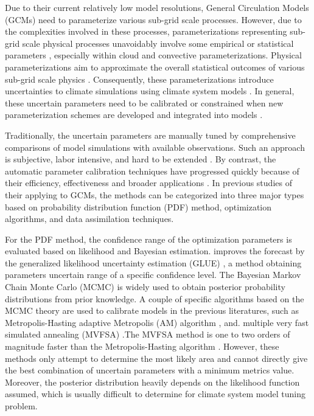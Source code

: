 \documentclass[gmd, manuscript]{copernicus}
\begin{document}
\introduction  %

Due to their current relatively low model resolutions, General Circulation Models (GCMs) need to parameterize various sub-grid scale processes. However, due to the complexities involved in these processes, parameterizations representing sub-grid scale physical processes unavoidably involve some empirical or statistical parameters \citep{hack1994climate}, especially within cloud and convective parameterizations. Physical parameterizations aim to approximate the overall statistical outcomes of various sub-grid scale physics \citep{williams2005modelling}. Consequently, these parameterizations introduce uncertainties to climate simulations using climate system models \citep{warren1979seasonal}. In general, these uncertain parameters need to be calibrated or constrained when new parameterization schemes are developed and integrated into models \citep{li2013evaluation}.


Traditionally, the uncertain parameters are manually tuned by comprehensive comparisons of model simulations with available observations. Such an approach is subjective, labor intensive, and hard to be extended \citep{hakkarainen2012closure, allen2000quantifying}. By contrast, the automatic parameter calibration techniques have progressed quickly because of their efficiency, effectiveness and broader applications \citep{emi2013collaborative,elkinton2008algorithms,jakumeit2005parameter,chen1999optimum}. In previous studies of their applying to GCMs, the methods can be categorized into three major types based on probability distribution function (PDF) method, optimization algorithms, and data assimilation techniques. 


For the PDF method, the confidence range of the optimization parameters is evaluated based on likelihood and Bayesian estimation. \cite{cameron1999flood} improves the forecast by the generalized likelihood uncertainty estimation (GLUE) \citep{beven1992future}, a method obtaining parameters uncertain range of a specific confidence level. The Bayesian Markov Chain Monte Carlo (MCMC) \citep{gilks2005markov} is widely used to obtain posterior probability distributions from prior knowledge. A couple of specific algorithms based on the MCMC theory are used to calibrate models in the previous literatures, such as Metropolis-Hasting \cite{sun2013inverse} adaptive Metropolis (AM) algorithm \cite{hararuk2014evaluation}, and. multiple very fast simulated annealing (MVFSA)\cite{jackson2008error} .The MVFSA method is one to two orders of magnitude faster than the Metropolis-Hasting algorithm \citep{jackson2004efficient}. However, these methods only attempt to determine the most likely area and cannot directly give the best combination of uncertain parameters with a minimum metrics value. Moreover, the posterior distribution heavily depends on the likelihood function assumed, which is usually difficult to determine for climate system model tuning problem.
\end{document}
